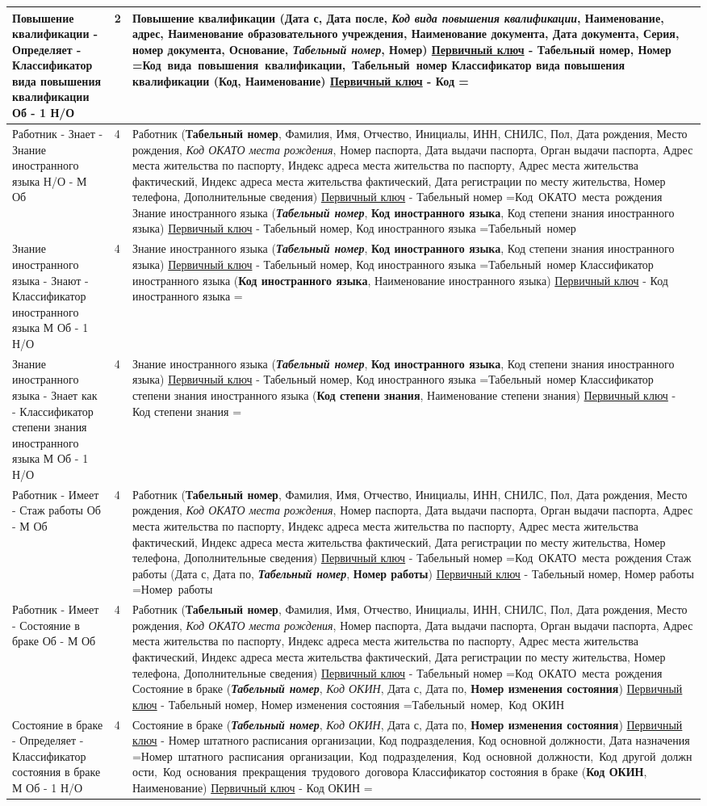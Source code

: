 \documentclass[10pt, a4paper]{article}
\newcommand{\pk}[1]{\textbf{#1}}
\newcommand{\fk}[1]{\textit{#1}}
\newcommand{\pfk}[1]{\pk{\fk{#1}}}
\newcommand{\firstColumn}[4]{#1 - \newline #2 - \newline #3 \newline\newline #4}
\newcommand{\thirdColumn}[6]{
#1 \newline 
\underline{Первичный ключ} - #2 \newline 
\setbox0=\hbox{#3\unskip}\ifdim\wd0=0pt
\else
  \underline{Внешний(е) ключ(-и)}: #3 \newline
\fi
#4 \newline 
\underline{Первичный ключ} - #5 \newline
\setbox0=\hbox{#6\unskip}\ifdim\wd0=0pt
\else
  \underline{Внешний(е) ключ(-и)}: #6 \newline
\fi
}
\newcommand\ruleOneMondatoryOneOptionalNum{2}
\newcommand\ruleOneMondatoryOneOptional{1 Об - 1 Н/О}
\newcommand\ruleOneOptionalManyMondatoryNum{4}
\newcommand\ruleOneOptionalManyMondatory{1 Н/О - М Об}
\newcommand\ruleManyMondatoryOneOptionalNum{4}
\newcommand\ruleManyMondatoryOneOptional{М Об - 1 Н/О}
\newcommand\ruleOneMondatoryManyMondatoryNum{4}
\newcommand\ruleOneMondatoryManyMondatory{1 Об - М Об}
\newcommand\rabotnik{Работник (\pk{Табельный номер}, Фамилия, Имя, Отчество, Инициалы, ИНН, СНИЛС, Пол, Дата рождения, Место рождения, \fk{Код ОКАТО места рождения}, Номер паспорта, Дата выдачи паспорта, Орган выдачи паспорта, Адрес места жительства по паспорту, Индекс адреса места жительства по паспорту, Адрес места жительства фактический, Индекс адреса места жительства фактический, Дата регистрации по месту жительства, Номер телефона, Дополнительные сведения)}
\newcommand\rabotnikPK{Табельный номер}
\newcommand\rabotnikFK{Код ОКАТО места рождения}
\newcommand\kInostrannogoYazika{Классификатор иностранного языка (\pk{Код иностранного языка}, Наименование иностранного языка)}
\newcommand\kInostrannogoYazikaPK{Код иностранного языка}
\newcommand\kInostrannogoYazikaFK{}
\newcommand\kStepeniZnaniaInostrannogoYazika{Классификатор степени знания иностранного языка (\pk{Код степени знания}, Наименование степени знания)}
\newcommand\kStepeniZnaniaInostrannogoYazikaPK{Код степени знания}
\newcommand\kStepeniZnaniaInostrannogoYazikaFK{}
\newcommand\znanieInostrannogoYazika{Знание иностранного языка (\pfk{Табельный номер}, \pk{Код иностранного языка}, Код степени знания иностранного языка)}
\newcommand\znanieInostrannogoYazikaPK{Табельный номер, Код иностранного языка}
\newcommand\znanieInostrannogoYazikaFK{Табельный номер}
\newcommand\shtatnieEdinitsiPK{Номер штатного расписания организации, Код подразделения, Код основной должности, Дата назначения}
\newcommand\shtatnieEdinitsiFK{Номер штатного расписания организации, Код подразделения, Код основной должности, Код другой должности, Код основания прекращения трудового договора}
\newcommand\stazhRaboti{Стаж работы (Дата с, Дата по, \pfk{Табельный номер}, \pk{Номер работы})}
\newcommand\stazhRabotiPK{Табельный номер, Номер работы}
\newcommand\stazhRabotiFK{Номер работы}
\newcommand\kSostoyaniaVBrake{Классификатор состояния в браке (\pk{Код ОКИН}, Наименование)}
\newcommand\kSostoyaniaVBrakePK{Код ОКИН}
\newcommand\kSostoyaniaVBrakeFK{}
\newcommand\sostoyaniyeVBrake{Состояние в браке (\pfk{Табельный номер}, \fk{Код ОКИН}, Дата с, Дата по, \pk{Номер изменения состояния})}
\newcommand\sostoyaniyeVBrakePK{Табельный номер, Номер изменения состояния}
\newcommand\sostoyaniyeVBrakeFK{Табельный номер, Код ОКИН}
\newcommand\povishenieKvalifikatsii{Повышение квалификации (Дата с, Дата после, \fk{Код вида повышения квалификации}, Наименование, адрес, Наименование образовательного учреждения, Наименование документа, Дата документа, Серия, номер документа, Основание, \pfk{Табельный номер}, \pk{Номер})}
\newcommand\povishenieKvalifikatsiiPK{Табельный номер, Номер}
\newcommand\povishenieKvalifikatsiiFK{Код вида повышения квалификации, Табельный номер}
\newcommand\kVidaPovisheniyaKvalifikatsii{Классификатор вида повышения квалификации (\pk{Код}, Наименование)}
\newcommand\kVidaPovisheniyaKvalifikatsiiPK{Код}
\newcommand\kVidaPovisheniyaKvalifikatsiiFK{}
\begin{document}
\begin{center}
\begin{longtable}{ | m{3cm} | m{.1cm}| m{11cm} | }
 \hline
 \firstColumn{Повышение квалификации}{Определяет}{Классификатор вида повышения квалификации}{\ruleOneMondatoryOneOptional} & \ruleOneMondatoryOneOptionalNum & \thirdColumn{\povishenieKvalifikatsii}{\povishenieKvalifikatsiiPK}{\povishenieKvalifikatsiiFK}{\kVidaPovisheniyaKvalifikatsii}{\kVidaPovisheniyaKvalifikatsiiPK}{\kVidaPovisheniyaKvalifikatsiiFK} \\ 
 
 \hline
 \firstColumn{Работник}{Знает}{Знание иностранного языка}{\ruleOneOptionalManyMondatory} & \ruleOneOptionalManyMondatoryNum & \thirdColumn{\rabotnik}{\rabotnikPK}{\rabotnikFK}{\znanieInostrannogoYazika}{\znanieInostrannogoYazikaPK}{\znanieInostrannogoYazikaFK} \\ 
 
 \hline
 \firstColumn{Знание иностранного языка}{Знают}{Классификатор иностранного языка}{\ruleManyMondatoryOneOptional} & \ruleManyMondatoryOneOptionalNum & \thirdColumn{\znanieInostrannogoYazika}{\znanieInostrannogoYazikaPK}{\znanieInostrannogoYazikaFK}{\kInostrannogoYazika}{\kInostrannogoYazikaPK}{\kInostrannogoYazikaFK} \\ 
 
 \hline
 \firstColumn{Знание иностранного языка}{Знает как}{Классификатор степени знания иностранного языка}{\ruleManyMondatoryOneOptional} & \ruleManyMondatoryOneOptionalNum & \thirdColumn{\znanieInostrannogoYazika}{\znanieInostrannogoYazikaPK}{\znanieInostrannogoYazikaFK}{\kStepeniZnaniaInostrannogoYazika}{\kStepeniZnaniaInostrannogoYazikaPK}{\kStepeniZnaniaInostrannogoYazikaFK} \\ 
 
 \hline
 \firstColumn{Работник}{Имеет}{Стаж работы}{\ruleOneMondatoryManyMondatory} & \ruleOneMondatoryManyMondatoryNum & \thirdColumn{\rabotnik}{\rabotnikPK}{\rabotnikFK}{\stazhRaboti}{\stazhRabotiPK}{\stazhRabotiFK} \\ 
 
 \hline
 \firstColumn{Работник}{Имеет}{Состояние в браке}{\ruleOneMondatoryManyMondatory} & \ruleOneMondatoryManyMondatoryNum & \thirdColumn{\rabotnik}{\rabotnikPK}{\rabotnikFK}{\sostoyaniyeVBrake}{\sostoyaniyeVBrakePK}{\sostoyaniyeVBrakeFK} \\ 
 
 \hline
 \firstColumn{Состояние в браке}{Определяет}{Классификатор состояния в браке}{\ruleManyMondatoryOneOptional} & \ruleManyMondatoryOneOptionalNum & \thirdColumn{\sostoyaniyeVBrake}{\shtatnieEdinitsiPK}{\shtatnieEdinitsiFK}{\kSostoyaniaVBrake}{\kSostoyaniaVBrakePK}{\kSostoyaniaVBrakeFK} \\ 
 

\end{longtable}
\end{center}
\end{document}
